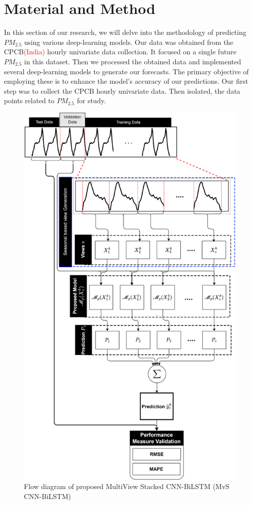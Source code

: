 \documentclass[a4paper, fleqn]{cas-sc}
\theoremstyle{definition}
\theoremstyle{remark}
\begin{document}
\section{Material and Method}
In this section of our research,  we will delve into the methodology of predicting $PM_{2.5}$ using various deep-learning models. Our data was obtained from the CPCB\textcolor{red}{(India)} hourly univariate data collection. It focused on a single future $PM_{2.5}$ in this dataset. Then we processed the obtained data and implemented several deep-learning models to generate our forecasts. The primary objective of employing these is to enhance the model's accuracy of our predictions. Our first step was to collect the CPCB hourly univariate data. Then isolated, the data points related to $PM_{2.5}$ for study.
\begin{figure}[h!]
	\centering
		\includegraphics[scale=0.6]{MvS CNN-BiLSTM}
	  \caption{Flow diagram of proposed MultiView Stacked CNN-BiLSTM (MvS CNN-BiLSTM)}\label{Muticbilstm}
\end{figure}
\end{document}
